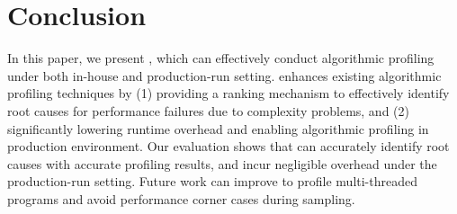 \section{Conclusion}
\label{sec:con}

In this paper, we present \Tool, which can effectively conduct algorithmic profiling
under both in-house and production-run setting.
\Tool enhances existing algorithmic profiling techniques by 
(1) providing a ranking mechanism to effectively identify root 
causes for performance failures due to complexity problems, 
and (2) significantly lowering runtime overhead 
and enabling algorithmic profiling in production environment. 
Our evaluation shows that \Tool can accurately identify root causes 
with accurate profiling results, 
and incur negligible overhead under the production-run setting. 
Future work can improve \Tool to profile multi-threaded programs 
and avoid performance corner cases during sampling. 

